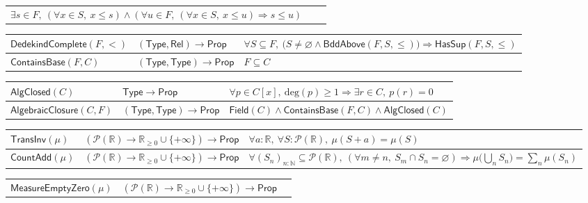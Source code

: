 \documentclass[11pt,reqno]{amsart}
\theoremstyle{blueplain}
\numberwithin{equation}{section}
\begin{document}
{\begin{tabular}{|m{5cm}|m{5cm}|m{8.3cm}|}
		$\exists s\in F,\ (\forall x\in S,\ x\leq s)\wedge
		(\forall u\in F,\ (\forall x\in S,\ x\leq u)\Rightarrow s\leq u)$ \\ 
	\end{tabular}
	\noindent \newline
	\noindent
	\begin{tabular}{|m{5cm}|m{5cm}|m{8.3cm}|}
		\hline
		$\mathsf{DedekindComplete}(F,<)$ & $(\mathsf{Type},\mathsf{Rel})\to\mathsf{Prop}$ &
		$\forall S\subseteq F,\ \bigl(S\neq\varnothing\wedge
		\mathsf{BddAbove}(F,S,\leq)\bigr)\Rightarrow\mathsf{HasSup}(F,S,\leq)$ \\ \hline
		$\mathsf{ContainsBase}(F,C)$ & $(\mathsf{Type},\mathsf{Type})\to\mathsf{Prop}$ &
		$F\subseteq C$ \\ 
	\end{tabular}%
	\noindent \newline
	\noindent
	\begin{tabular}{|m{5cm}|m{5cm}|m{8.3cm}|}
		\hline
		$\mathsf{AlgClosed}(C)$ & $\mathsf{Type}\to\mathsf{Prop}$ &
		$\forall p\in C[x],\ \mathrm{deg}(p)\geq 1\Rightarrow\exists r\in C,\ p(r)=0$ \\ \hline
		$\mathsf{AlgebraicClosure}(C,F)$ & $(\mathsf{Type},\mathsf{Type})\to\mathsf{Prop}$ &
		$\mathsf{Field}(C)\wedge\mathsf{ContainsBase}(F,C)\wedge\mathsf{AlgClosed}(C)$ \\ 
	\end{tabular}%
	\noindent \newline
	\noindent
	\begin{tabular}{|m{5cm}|m{5cm}|m{8.3cm}|}
		\hline
		$\mathsf{TransInv}(\mu)$ & $(\mathcal{P}(\mathbb{R})\to\mathbb{R}_{\geq 0}\cup\{+\infty\})\to\mathsf{Prop}$ &
		$\forall a:\mathbb{R},\ \forall S:\mathcal{P}(\mathbb{R}),\ \mu(S+a)=\mu(S)$ \\ \hline
		$\mathsf{CountAdd}(\mu)$ & $(\mathcal{P}(\mathbb{R})\to\mathbb{R}_{\geq 0}\cup\{+\infty\})\to\mathsf{Prop}$ &
		$\forall(S_n)_{n:\mathbb{N}}\subseteq\mathcal{P}(\mathbb{R}),\
		(\forall m\neq n,\ S_m\cap S_n=\varnothing)\Rightarrow
		\mu\bigl(\bigcup_n S_n\bigr)=\sum_n\mu(S_n)$ \\ 
	\end{tabular}
	\noindent \newline
	\noindent
	\begin{tabular}{|m{5cm}|m{5cm}|m{8.3cm}|}
		\hline
		$\mathsf{MeasureEmptyZero}(\mu)$ & $(\mathcal{P}(\mathbb{R})\to\mathbb{R}_{\geq 0}\cup\{+\infty\})\to\mathsf{Prop}$ &

\end{tabular}}
\end{document}

